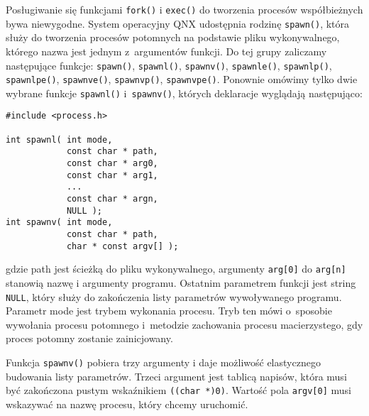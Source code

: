 Posługiwanie się funkcjami \texttt{fork()} i \texttt{exec()} do tworzenia
procesów współbieżnych bywa niewygodne. System operacyjny QNX udostępnia
rodzinę \texttt{spawn()}, która służy do tworzenia procesów potomnych na
podstawie pliku wykonywalnego, którego nazwa jest jednym z argumentów funkcji.
Do tej grupy zaliczamy następujące funkcje: \texttt{spawn()},
\texttt{spawnl()}, \texttt{spawnv()}, \texttt{spawnle()}, \texttt{spawnlp()},
\texttt{spawnlpe()}, \texttt{spawnve()}, \texttt{spawnvp()},
\texttt{spawnvpe()}. Ponownie omówimy tylko dwie wybrane funkcje
\texttt{spawnl()} i~\texttt{spawnv()}, których deklaracje wyglądają
następująco:

\begin{lstlisting}[style=MyCStyle]
#include <process.h>

int spawnl( int mode,
            const char * path,
            const char * arg0,
            const char * arg1,
            ...
            const char * argn,
            NULL );
int spawnv( int mode,
            const char * path,
            char * const argv[] );
\end{lstlisting}
gdzie path jest ścieżką do pliku wykonywalnego, argumenty \texttt{arg[0]} do
\texttt{arg[n]} stanowią nazwę i argumenty programu. Ostatnim parametrem
funkcji jest string \texttt{NULL}, który służy do zakończenia listy parametrów
wywoływanego programu. Parametr mode jest trybem wykonania procesu. Tryb ten
mówi o sposobie wywołania procesu potomnego i metodzie zachowania procesu
macierzystego, gdy proces potomny zostanie zainicjowany.

Funkcja \texttt{spawnv()} pobiera trzy argumenty i daje możliwość elastycznego
budowania listy parametrów. Trzeci argument jest tablicą napisów, która musi być
zakończona pustym wskaźnikiem \texttt{((char *)0)}. Wartość pola
\texttt{argv[0]} musi wskazywać na nazwę procesu, który chcemy uruchomić.

